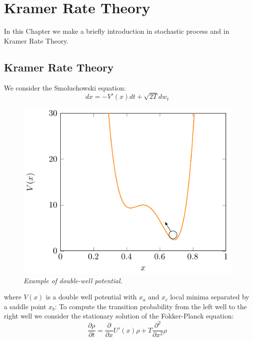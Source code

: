 
\chapter{Kramer Rate Theory}\label{kramer}
\lhead[\fancyplain{}{\bfseries\thepage}]{\fancyplain{}{\bfseries\rightmark}}
In this Chapter we make a briefly introduction in stochastic process and in Kramer Rate Theory.
\section{Kramer Rate Theory}
We consider the Smoluchowski equation:
\begin{equation}
dx = -V'(x)dt + \sqrt{2T} dw_t
\end{equation}

\begin{figure}
\centering
\includegraphics[scale=1.2]{images/kramerwell.pdf}
\caption{\emph{Example of double-well potential.}}
\label{fig:kr}


\end{figure}
where $V(x)$ is a double well potential with $x_a$ and $x_c$ local minima separated by a saddle point $x_b$: To compute the transition probability from the left well to the right well we consider the stationary solution of the Fokker-Planck equation:
\begin{equation}
\frac{\partial \rho}{\partial t } = \frac{\partial}{\partial x} U'(x)\rho + T \frac{\partial ^2 }{\partial x^2} \rho
\end{equation}

